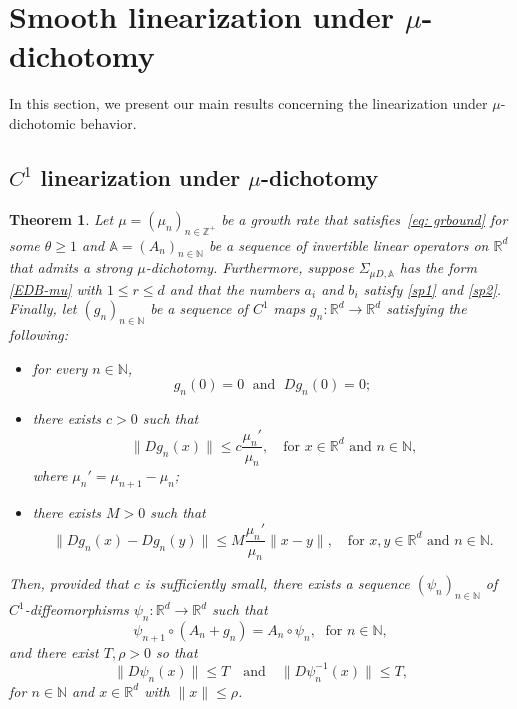 \documentclass[reqno, a4paper, 10pt]{amsart}
\theoremstyle{plain}
\numberwithin{equation}{section}
\newtheorem{theorem}{Theorem}
\theoremstyle{remark}
\def\N{\mathbb{N}}
\def\R{\mathbb{R}}
\def\Z{\mathbb{Z}}
\begin{document}
\section{Smooth linearization under $\mu$-dichotomy}
\label{sec: lin pol} 


In this section, we present our main results concerning the linearization under $\mu$-dichotomic behavior. 


\subsection{$C^1$ linearization under $\mu$-dichotomy}

\begin{theorem}\label{theo: main linearization discrete}
Let $\mu=(\mu_n)_{n\in \Z^+}$ be a growth rate that satisfies~\eqref{eq: grbound} for some $\theta \ge 1$ and $\mathbb A=(A_n)_{n\in \mathbb N}$ be a sequence of invertible linear operators on $\mathbb R^d$ that admits a strong $\mu$-dichotomy. Furthermore, suppose $\Sigma_{\mu D, \mathbb A}$ has the form \eqref{EDB-mu}
with $1\le r\le d$ and that the numbers $a_i$ and $b_i$ satisfy \eqref{sp1} and \eqref{sp2}.
Finally, let $(g_n)_{n\in \N}$ be a sequence of $C^1$ maps $g_n\colon \R^d \to \R^d$ satisfying the following:
\begin{itemize}
\item for every $n\in \N$,
\begin{equation}\label{eq: gn 0 and Dgn 0}
g_n(0)=0 \;\text{ and } \; Dg_n(0)=0;
\end{equation}
\item there exists $c>0$ such that 
\begin{equation}\label{eq: bound deriv g}
\|Dg_n(x)\| \le c\frac{\mu_n'}{\mu_n}, \quad \text{for $x\in \R^d$ and $n\in \N$,}
\end{equation}
where $\mu_n'=\mu_{n+1}-\mu_n$;
\item there exists $M>0$ such that 
\begin{equation}\label{4-4-3}
\|Dg_n(x)-Dg_n(y)\| \le M\frac{\mu_n'}{\mu_n}\|x-y\|, \quad \text{for $x, y\in \R^d$ and $n\in \N$.}
\end{equation}
\end{itemize}
Then, provided that $c$ is sufficiently small, there exists a sequence $(\psi_n)_{n\in \N}$ of $C^1$-diffeomorphisms $\psi_n\colon \R^d \to \R^d$ such that
\begin{equation}\label{lincond}
\psi_{n+1}\circ (A_n+g_n)=A_n  \circ \psi_n, \; \text{ for } n\in \N,
\end{equation}
and there exist $T, \rho>0$ so that 
\begin{equation}\label{hn-1}
\|D\psi_n(x)\| \le T \quad \text{and} \quad \|D\psi_n^{-1}(x)\| \le T,
\end{equation}
for $n\in \N$ and $x\in \R^d$ with $\|x\|\le \rho$.
\end{theorem}
\end{document}

